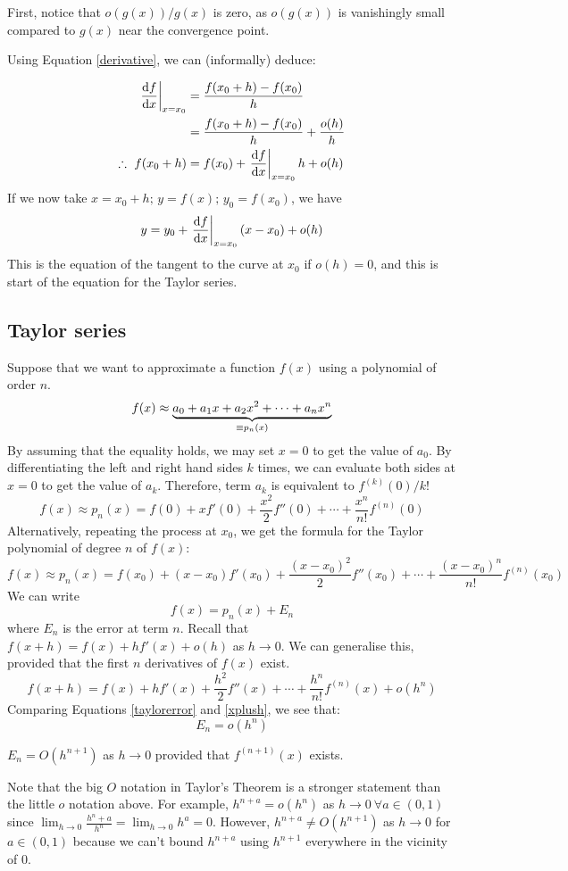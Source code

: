 First, notice that \(o(g(x))/g(x)\) is zero, as \(o(g(x))\) is vanishingly small compared to \(g(x)\) near the convergence point.

Using Equation \eqref{derivative}, we can (informally) deduce:

\begin{align*}
	\eval{\frac{\dd{f}}{\dd{x}}}_{x=x_0} & = \frac{f(x_0 + h) - f(x_0)}{h}                          \\
	                                     & = \frac{f(x_0 + h) - f(x_0)}{h} + \frac{o(h)}{h}         \\
	\therefore\ f(x_0 + h)                & = f(x_0) + \eval{\frac{\dd{f}}{\dd{x}}}_{x=x_0} h + o(h)
\end{align*}
If we now take \(x=x_0+h;\,y=f(x);\,y_0=f(x_0)\), we have
\[
	y = y_0 + \eval{\frac{\dd{f}}{\dd{x}}}_{x=x_0}(x - x_0) + o(h)
\]
This is the equation of the tangent to the curve at \(x_0\) if \(o(h)=0\), and this is start of the equation for the Taylor series.

\subsection{Taylor series}
Suppose that we want to approximate a function \(f(x)\) using a polynomial of order \(n\).
\[
	f(x) \approx \underbrace{a_0 + a_1 x + a_2 x^2 + \cdots + a_n x^n}_{\mathclap{\equiv p_n(x)}}
\]
By assuming that the equality holds, we may set \(x=0\) to get the value of \(a_0\).
By differentiating the left and right hand sides \(k\) times, we can evaluate both sides at \(x=0\) to get the value of \(a_k\).
Therefore, term \(a_k\) is equivalent to \(f^{(k)}(0)/k!
\)
\[
	f(x) \approx p_n(x) = f(0) + xf'(0) + \frac{x^2}{2}f''(0) + \cdots + \frac{x^n}{n!}f^{(n)}(0)
\]
Alternatively, repeating the process at \(x_0\), we get the formula for the Taylor polynomial of degree \(n\) of \(f(x)\):
\[
	f(x) \approx p_n(x) = f(x_0) + (x-x_0)f'(x_0) + \frac{(x-x_0)^2}{2}f''(x_0) + \cdots + \frac{(x-x_0)^n}{n!}f^{(n)}(x_0)
\]
We can write
\begin{equation}\label{taylorerror}
	f(x) = p_n(x) + E_n
\end{equation}
where \(E_n\) is the error at term \(n\).
Recall that \(f(x+h) = f(x) + hf'(x) + o(h)\) as \(h \to 0\).
We can generalise this, provided that the first \(n\) derivatives of \(f(x)\) exist.
\begin{equation}\label{xplush}
	f(x+h) = f(x) + hf'(x) + \frac{h^2}{2}f''(x) + \cdots + \frac{h^n}{n!}f^{(n)}(x) + o(h^n)
\end{equation}
Comparing Equations \eqref{taylorerror} and \eqref{xplush}, we see that:
\[
	E_n = o(h^n)
\]
\begin{theorem}
	\(E_n = O(h^{n+1})\) as \(h \to 0\) provided that \(f^{(n+1)}(x)\) exists.
\end{theorem}
Note that the big \(O\) notation in Taylor's Theorem is a stronger statement than the little \(o\) notation above.
For example, \(h^{n+a}=o(h^n)\) as \(h \to 0\ \forall a \in (0, 1)\) since \(\lim_{h\to 0} \frac{h^n+a}{h^n} = \lim_{h\to 0} h^a = 0\).
However, \(h^{n+a} \neq O(h^{n+1})\) as \(h \to 0\) for \(a \in (0, 1)\) because we can't bound \(h^{n+a}\) using \(h^{n+1}\) everywhere in the vicinity of \(0\).

